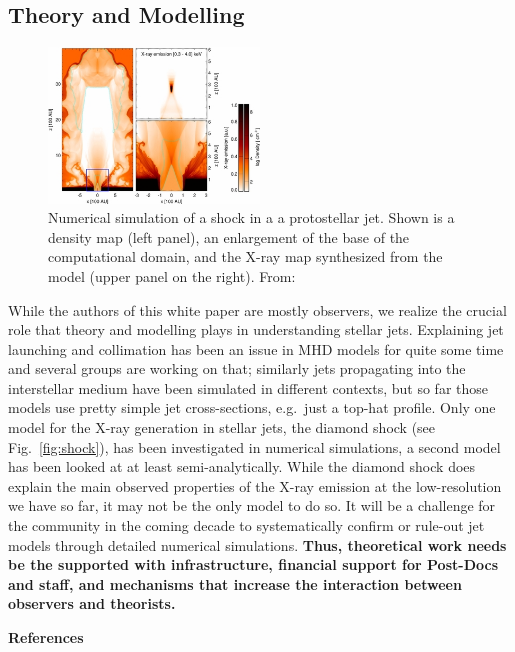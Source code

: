 \documentclass[12pt]{article}
\begin{document}
\subsection{Theory and Modelling}
\begin{figure}[htb]
\centering
\includegraphics[width=0.5\textwidth]{apj395310f4_lr.jpg}
\caption{Numerical simulation of a shock in a a protostellar jet. Shown is a density map (left panel), an enlargement of the base of the computational domain, and the X-ray map synthesized from the model (upper panel on the right).  From:}
\label{fig:CIV}
\end{figure}

While the authors of this white paper are mostly observers, we realize the crucial role that theory and modelling plays in understanding stellar jets. Explaining jet launching and collimation has been an issue in MHD models for quite some time and several groups are working on that; similarly jets propagating into the interstellar medium have been simulated in different contexts, but so far those models use pretty simple jet cross-sections, e.g.\ just a top-hat profile. Only one model for the X-ray generation in stellar jets, the diamond shock (see Fig.~\ref{fig:shock}), has been investigated in numerical simulations, a second model has been looked at at least semi-analytically. While the diamond shock does explain the main observed properties of the X-ray emission at the low-resolution we have so far, it may not be the only model to do so. It will be a challenge for the community in the coming decade to systematically confirm or rule-out jet models through detailed numerical simulations. \textbf{Thus, theoretical work needs be the supported with infrastructure, financial support for Post-Docs and staff, and mechanisms that increase the interaction between observers and theorists.}

\pagebreak
\textbf{References}
\end{document}
